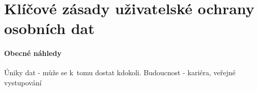 \chapter{Klíčové zásady uživatelské ochrany osobních dat}

\subsubsection{Obecné náhledy}
Úniky dat - může se k~tomu dostat kdokoli.
Budoucnost - kariéra, veřejné vystupování